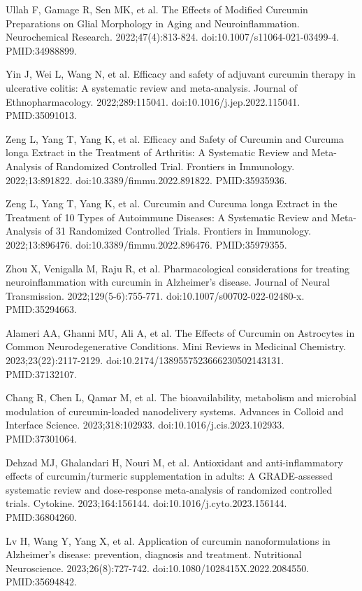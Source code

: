 \documentclass[12pt,oneside]{book}
\newcommand{\reff}[2]{\par\hangindent=7mm\hangafter=1\noindent[#1]\hspace{2mm}#2\par}
\begin{document}
\reff{19}{Ullah F, Gamage R, Sen MK, et al. The Effects of Modified Curcumin Preparations on Glial Morphology in Aging and Neuroinflammation. Neurochemical Research. 2022;47(4):813-824. doi:10.1007/s11064-021-03499-4. PMID:34988899.}

\reff{20}{Yin J, Wei L, Wang N, et al. Efficacy and safety of adjuvant curcumin therapy in ulcerative colitis: A systematic review and meta-analysis. Journal of Ethnopharmacology. 2022;289:115041. doi:10.1016/j.jep.2022.115041. PMID:35091013.}

\reff{21}{Zeng L, Yang T, Yang K, et al. Efficacy and Safety of Curcumin and Curcuma longa Extract in the Treatment of Arthritis: A Systematic Review and Meta-Analysis of Randomized Controlled Trial. Frontiers in Immunology. 2022;13:891822. doi:10.3389/fimmu.2022.891822. PMID:35935936.}

\reff{22}{Zeng L, Yang T, Yang K, et al. Curcumin and Curcuma longa Extract in the Treatment of 10 Types of Autoimmune Diseases: A Systematic Review and Meta-Analysis of 31 Randomized Controlled Trials. Frontiers in Immunology. 2022;13:896476. doi:10.3389/fimmu.2022.896476. PMID:35979355.}

\reff{23}{Zhou X, Venigalla M, Raju R, et al. Pharmacological considerations for treating neuroinflammation with curcumin in Alzheimer's disease. Journal of Neural Transmission. 2022;129(5-6):755-771. doi:10.1007/s00702-022-02480-x. PMID:35294663.}

\reff{24}{Alameri AA, Ghanni MU, Ali A, et al. The Effects of Curcumin on Astrocytes in Common Neurodegenerative Conditions. Mini Reviews in Medicinal Chemistry. 2023;23(22):2117-2129. doi:10.2174/1389557523666230502143131. PMID:37132107.}

\reff{25}{Chang R, Chen L, Qamar M, et al. The bioavailability, metabolism and microbial modulation of curcumin-loaded nanodelivery systems. Advances in Colloid and Interface Science. 2023;318:102933. doi:10.1016/j.cis.2023.102933. PMID:37301064.}

\reff{26}{Dehzad MJ, Ghalandari H, Nouri M, et al. Antioxidant and anti-inflammatory effects of curcumin/turmeric supplementation in adults: A GRADE-assessed systematic review and dose-response meta-analysis of randomized controlled trials. Cytokine. 2023;164:156144. doi:10.1016/j.cyto.2023.156144. PMID:36804260.}

\reff{27}{Lv H, Wang Y, Yang X, et al. Application of curcumin nanoformulations in Alzheimer's disease: prevention, diagnosis and treatment. Nutritional Neuroscience. 2023;26(8):727-742. doi:10.1080/1028415X.2022.2084550. PMID:35694842.}
\end{document}
